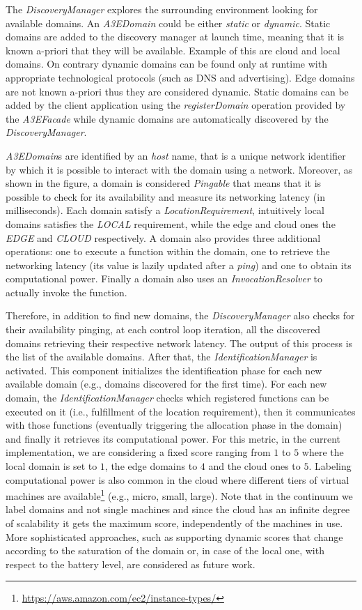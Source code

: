 The \textit{DiscoveryManager} explores the surrounding environment looking for available domains. An  \textit{A3EDomain} could be either \textit{static} or \textit{dynamic}. Static domains are added to the discovery manager at launch time, meaning that it is known a-priori that they will be available. Example of this are cloud and local domains. On contrary dynamic domains can be found only at runtime with appropriate technological protocols (such as DNS and advertising). Edge domains are not known a-priori thus they are considered dynamic. Static domains can be added by the client application using the \textit{registerDomain} operation provided by the \textit{A3EFacade} while dynamic domains are automatically discovered by the \textit{DiscoveryManager}.

 \textit{A3EDomain}s  are identified by an \textit{host} name, that is a unique network identifier by which it is possible to interact with the domain using a network. Moreover, as shown in the figure, a domain is considered \textit{Pingable} that means that it is possible to check for its availability and measure its networking latency (in milliseconds). Each domain satisfy a \textit{LocationRequirement}, intuitively local domains satisfies the \textit{LOCAL} requirement, while the edge and cloud ones the \textit{EDGE} and \textit{CLOUD} respectively.  A domain also provides three additional operations: one to execute a function within the domain, one to retrieve the networking latency (its value is lazily updated after a \textit{ping}) and one to obtain its computational power. Finally a domain also uses an \textit{InvocationResolver} to actually invoke the function. 
 
Therefore, in addition to find new domains, the \textit{DiscoveryManager} also checks for their availability pinging, at each control loop iteration, all the discovered domains retrieving their respective network latency. The output of this process is the list of the available domains. After that, the \textit{IdentificationManager} is activated. This component initializes the identification phase for each new available domain (e.g., domains discovered for the first time). For each new domain, the \textit{IdentificationManager} checks which registered functions can be executed on it (i.e., fulfillment of the location requirement), then it communicates with those functions (eventually triggering the allocation phase in the domain) and finally it retrieves its computational power. For this metric, in the current implementation, we are considering a fixed score ranging from $1$ to $5$ where the local domain is set to $1$, the edge domains to $4$ and the cloud ones to $5$. Labeling computational power is also common in the cloud where different tiers of virtual machines are available\footnote{\url{https://aws.amazon.com/ec2/instance-types/}} (e.g., micro, small, large). Note that in the continuum we label domains and not single machines and since the cloud has an infinite degree of scalability it gets the maximum score, independently of the machines in use. More sophisticated approaches, such as supporting dynamic scores that change according to the saturation of the domain or, in case of the local one, with respect to the battery level, are considered as future work.  

